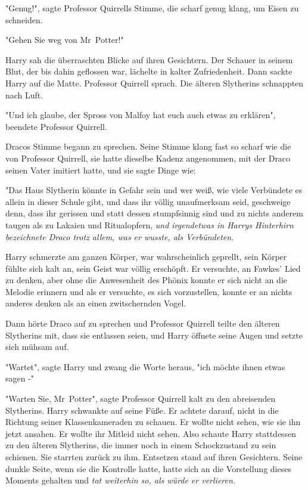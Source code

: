 {"Genug!", sagte Professor Quirrells Stimme, die scharf genug klang, um Eisen zu schneiden.

"Gehen Sie weg von Mr~Potter!"

Harry sah die überraschten Blicke auf ihren Gesichtern. Der Schauer in seinem Blut, der bis dahin geflossen war, lächelte in kalter Zufriedenheit. Dann sackte Harry auf die Matte. Professor Quirrell sprach. Die älteren Slytherins schnappten nach Luft.

"Und ich glaube, der Spross von Malfoy hat euch auch etwas zu erklären", beendete Professor Quirrell.

Dracos Stimme begann zu sprechen. Seine Stimme klang fast so scharf wie die von Professor Quirrell, sie hatte dieselbe Kadenz angenommen, mit der Draco seinen Vater imitiert hatte, und sie sagte Dinge wie:

"Das Haus Slytherin könnte in Gefahr sein und wer weiß, wie viele Verbündete es allein in dieser Schule gibt, und dass ihr völlig unaufmerksam seid, geschweige denn, dass ihr gerissen und statt dessen stumpfsinnig sind und zu nichts anderem taugen als zu Lakaien und Ritualopfern, \emph{und irgendetwas in Harrys Hinterhirn bezeichnete Draco trotz allem, was er wusste, als Verbündeten}.

Harry schmerzte am ganzen Körper, war wahrscheinlich geprellt, sein Körper fühlte sich kalt an, sein Geist war völlig erschöpft. Er versuchte, an Fawkes' Lied zu denken, aber ohne die Anwesenheit des Phönix konnte er sich nicht an die Melodie erinnern und als er versuchte, es sich vorzustellen, konnte er an nichts anderes denken als an einen zwitschernden Vogel.

Dann hörte Draco auf zu sprechen und Professor Quirrell teilte den älteren Slytherins mit, dass sie entlassen seien, und Harry öffnete seine Augen und setzte sich mühsam auf.

"Wartet", sagte Harry und zwang die Worte heraus, "ich möchte ihnen etwas sagen -"

"Warten Sie, Mr~Potter", sagte Professor Quirrell kalt zu den abreisenden Slytherins. Harry schwankte auf seine Füße. Er achtete darauf, nicht in die Richtung seiner Klassenkameraden zu schauen. Er wollte nicht sehen, wie sie ihn jetzt ansahen. Er wollte ihr Mitleid nicht sehen. Also schaute Harry stattdessen zu den älteren Slytherins, die immer noch in einem Schockzustand zu sein schienen. Sie starrten zurück zu ihm. Entsetzen stand auf ihren Gesichtern. Seine dunkle Seite, wenn sie die Kontrolle hatte, hatte sich an die Vorstellung dieses Moments gehalten und \emph{tat weiterhin so, als würde er verlieren.}

}
